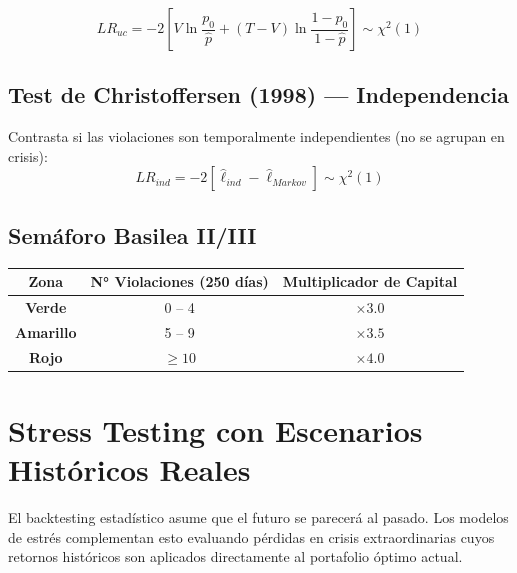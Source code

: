 \documentclass[11pt,a4paper]{article}
\begin{document}
\begin{equation}
    LR_{uc} = -2\left[V\ln\frac{p_0}{\hat{p}} + (T-V)\ln\frac{1-p_0}{1-\hat{p}}\right] \sim \chi^2(1)
\end{equation}

\subsection{Test de Christoffersen (1998) — Independencia}

Contrasta si las violaciones son temporalmente independientes (no se agrupan en crisis):
\begin{equation}
    LR_{ind} = -2\left[\hat{\ell}_{ind} - \hat{\ell}_{Markov}\right] \sim \chi^2(1)
\end{equation}

\subsection{Semáforo Basilea II/III}

\begin{center}
\begin{tabular}{ccc}
\toprule
\rowcolor{lightgray}
Zona & N° Violaciones (250 días) & Multiplicador de Capital \\
\midrule
\cellcolor{successgreen!20}\textcolor{successgreen}{\textbf{Verde}} & 0 -- 4 & $\times 3.0$ \\
\cellcolor{warnorange!20}\textcolor{warnorange}{\textbf{Amarillo}} & 5 -- 9 & $\times 3.5$ \\
\cellcolor{dangerred!20}\textcolor{dangerred}{\textbf{Rojo}} & $\geq 10$ & $\times 4.0$ \\
\bottomrule
\end{tabular}
\end{center}

\section{Stress Testing con Escenarios Históricos Reales}

El backtesting estadístico asume que el futuro se parecerá al pasado. Los modelos de estrés
complementan esto evaluando pérdidas en crisis extraordinarias cuyos retornos históricos
son aplicados directamente al portafolio óptimo actual.
\end{document}
